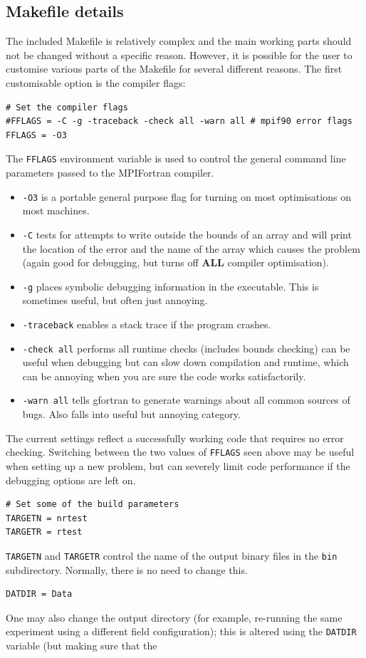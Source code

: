 \documentclass[a4paper,11pt,usenames,dvipsnames]{article}
\begin{document}
\subsection{Makefile details}
The included Makefile is relatively complex and the main working parts should not be changed without a specific reason. However, it is possible for the user to customise various parts of the Makefile for several different reasons. The first customisable option is the compiler flags:
\begin{verbatim}
# Set the compiler flags 
#FFLAGS = -C -g -traceback -check all -warn all # mpif90 error flags
FFLAGS = -O3 
\end{verbatim}
The \texttt{FFLAGS} environment variable is used to control the general command line parameters passed to the MPIFortran compiler. 

\begin{itemize}
 \item\texttt{-O3} is a portable general purpose flag for turning on most optimisations on most machines.
 \item\texttt{-C} tests for attempts to write outside the bounds of an array and will print the location of the error and the name of the array which causes the problem (again good for debugging, but turns off {\bf{ALL}} compiler optimisation).
 \item\texttt{-g} places symbolic debugging information in the executable. This is sometimes useful, but often just annoying.
 \item\texttt{-traceback} enables a stack trace if the program crashes.
 \item\texttt{-check all} performs all runtime checks (includes bounds checking) can be useful when debugging but can slow down compilation and runtime, which can be annoying when you are sure the code works satisfactorily.
 \item\texttt{-warn all} tells gfortran to generate warnings about all common sources of bugs. Also falls into useful but annoying category.
\end{itemize}
\noindent The current settings reflect a successfully working code that requires no error checking. Switching between the two values of \texttt{FFLAGS} seen above may be useful when setting up a new problem, but can severely limit code performance if the debugging options are left on.

\begin{verbatim}
# Set some of the build parameters
TARGETN = nrtest
TARGETR = rtest
\end{verbatim}
\texttt{TARGETN} and \texttt{TARGETR} control the name of the output binary files in the \texttt{bin} subdirectory. Normally, there is no need to change this.\\
\begin{verbatim}
DATDIR = Data
\end{verbatim}
One may also change the output directory (for example, re-running the same experiment using a different field configuration); this is altered using the \verb|DATDIR| variable (but making sure that the 
\end{document}
